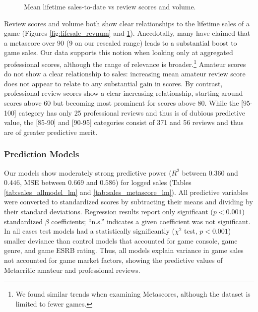 \documentclass[letterpaper]{article}
\begin{document}
\begin{figure}[tb]
\begin{subfigure}[b]{\linewidth}
\label{fig:lifesale_revscore}
\end{subfigure}

\caption{Mean lifetime sales-to-date vs review scores and volume.}
\label{fig:lifesale_plots}
\end{figure}


Review scores and volume both show clear relationships to the lifetime sales of a game (Figures \ref{fig:lifesale_revnum} and \ref{fig:lifesale_revscore}). Anecdotally, many have claimed that a metascore over 90 (9 on our rescaled range) leads to a substantial boost to game sales. Our data supports this notion when looking only at aggregated professional scores, although the range of relevance is broader.\footnote{We found similar trends when examining Metascores, although the dataset is limited to fewer games.} Amateur scores do not show a clear relationship to sales: increasing mean amateur review score does not appear to relate to any substantial gain in scores. By contrast, professional review scores show a clear increasing relationship, starting around scores above 60 but becoming most prominent for scores above 80. While the [95-100] category has only 25 professional reviews and thus is of dubious predictive value, the [85-90] and [90-95] categories consist of 371 and 56 reviews and thus are of greater predictive merit.

\subsubsection{Prediction Models}
Our models show moderately strong predictive power ($R^2$ between $0.360$ and $0.446$, MSE between $0.669$ and $0.586$) for logged sales (Tables \ref{tab:sales_allmodel_lm} and \ref{tab:sales_metascore_lm}). All predictive variables were converted to standardized scores by subtracting their means and dividing by their standard deviations. Regression results report only significant ($p < 0.001$) standardized $\beta$ coefficients; ``n.s.'' indicates a given coefficient was not significant. In all cases test models had a statistically significantly ($\chi^2$ test, $p < 0.001$) smaller deviance than control models that accounted for game console, game genre, and game ESRB rating. Thus, all models explain variance in game sales not accounted for game market factors, showing the predictive values of Metacritic amateur and professional reviews.
\end{document}
